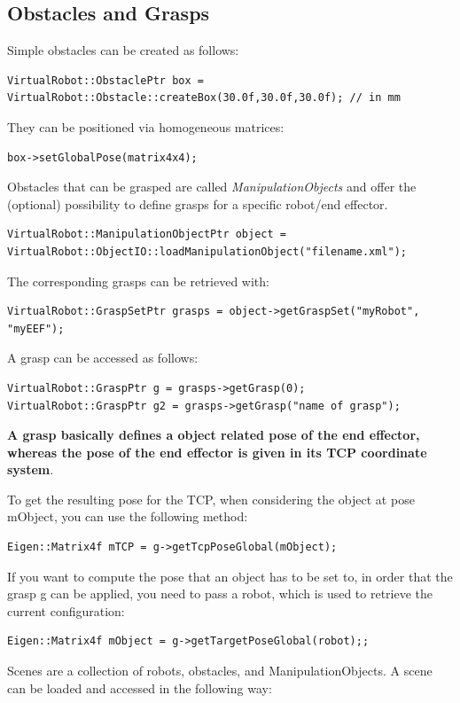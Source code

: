 \documentclass{book}
\begin{document}
\subsection{Obstacles and Grasps}
Simple obstacles can be created as follows: 
\begin{lstlisting}
VirtualRobot::ObstaclePtr box = VirtualRobot::Obstacle::createBox(30.0f,30.0f,30.0f); // in mm
\end{lstlisting}
They can be positioned via homogeneous matrices: 
\begin{lstlisting}
box->setGlobalPose(matrix4x4);
\end{lstlisting}
Obstacles that can be grasped are called \textit{ManipulationObjects} and offer the (optional) possibility to define grasps for a specific robot/end effector. 
\begin{lstlisting}
VirtualRobot::ManipulationObjectPtr object = VirtualRobot::ObjectIO::loadManipulationObject("filename.xml");
\end{lstlisting}
The corresponding grasps can be retrieved with: 
\begin{lstlisting}
VirtualRobot::GraspSetPtr grasps = object->getGraspSet("myRobot", "myEEF");
\end{lstlisting}
A grasp can be accessed as follows: 
\begin{lstlisting}
VirtualRobot::GraspPtr g = grasps->getGrasp(0);
VirtualRobot::GraspPtr g2 = grasps->getGrasp("name of grasp");
\end{lstlisting}
\textbf{A grasp basically defines a object related pose of the end effector, whereas the pose of the end effector is given in its TCP coordinate system}.\par To get the resulting pose for the TCP, when considering the object at pose mObject, you can use the following method: 
\begin{lstlisting}
Eigen::Matrix4f mTCP = g->getTcpPoseGlobal(mObject);
\end{lstlisting}
If you want to compute the pose that an object has to be set to, in order that the grasp g can be applied, you need to pass a robot, which is used to retrieve the current configuration: 
\begin{lstlisting}
Eigen::Matrix4f mObject = g->getTargetPoseGlobal(robot);;
\end{lstlisting}
Scenes are a collection of robots, obstacles, and ManipulationObjects. A scene can be loaded and accessed in the following way: 
\end{document}
